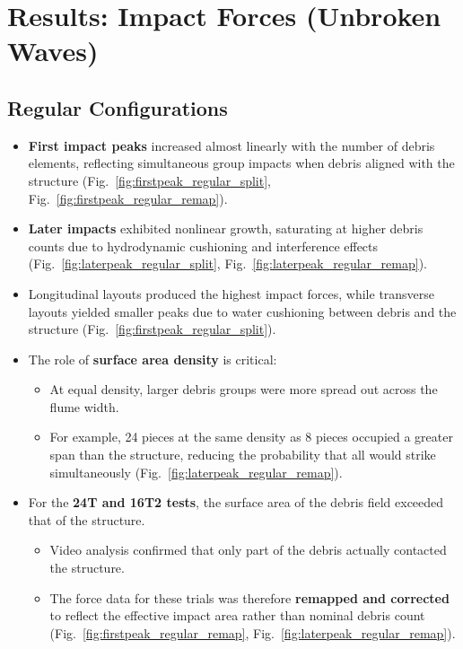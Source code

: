 \documentclass{article}
\begin{document}
\section{Results: Impact Forces (Unbroken Waves)}

\subsection{Regular Configurations}
\begin{itemize}
    \item \textbf{First impact peaks} increased almost linearly with the number of debris elements, reflecting simultaneous group impacts when debris aligned with the structure (Fig.~\ref{fig:firstpeak_regular_split}, Fig.~\ref{fig:firstpeak_regular_remap}).
    \item \textbf{Later impacts} exhibited nonlinear growth, saturating at higher debris counts due to hydrodynamic cushioning and interference effects (Fig.~\ref{fig:laterpeak_regular_split}, Fig.~\ref{fig:laterpeak_regular_remap}).
    \item Longitudinal layouts produced the highest impact forces, while transverse layouts yielded smaller peaks due to water cushioning between debris and the structure (Fig.~\ref{fig:firstpeak_regular_split}).
    \item The role of \textbf{surface area density} is critical:
    \begin{itemize}
        \item At equal density, larger debris groups were more spread out across the flume width.
        \item For example, 24 pieces at the same density as 8 pieces occupied a greater span than the structure, reducing the probability that all would strike simultaneously (Fig.~\ref{fig:laterpeak_regular_remap}).
    \end{itemize}
    \item For the \textbf{24T and 16T2 tests}, the surface area of the debris field exceeded that of the structure.
    \begin{itemize}
        \item Video analysis confirmed that only part of the debris actually contacted the structure.
        \item The force data for these trials was therefore \textbf{remapped and corrected} to reflect the effective impact area rather than nominal debris count (Fig.~\ref{fig:firstpeak_regular_remap}, Fig.~\ref{fig:laterpeak_regular_remap}).
    \end{itemize}
\end{itemize}
\end{document}

